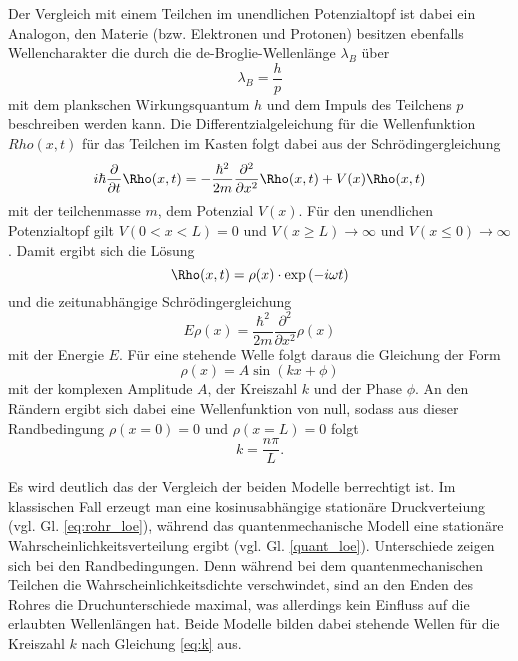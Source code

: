 Der Vergleich mit einem Teilchen im unendlichen Potenzialtopf ist dabei ein Analogon, 
den Materie (bzw. Elektronen und Protonen) besitzen ebenfalls Wellencharakter die durch die de-Broglie-Wellenlänge $\lambda_B$ über
\begin{equation}
    \lambda_B=\frac{h}{p}
\end{equation}
mit dem plankschen Wirkungsquantum $h$ und dem Impuls des Teilchens $p$ beschreiben werden kann.
Die Differentzialgeleichung für die Wellenfunktion $Rho(x,t)$ für das Teilchen im Kasten folgt dabei aus der Schrödingergleichung
\begin{equation}
    i\hbar \frac{\partial}{\partial t}\Rho(x,t)=-\frac{\hbar^2}{2m}\frac{\partial^2}{\partial x^2}\Rho(x,t)+V(x)\Rho(x,t)
\end{equation}
mit der teilchenmasse $m$, dem Potenzial $V(x)$. Für den unendlichen Potenzialtopf gilt $V(0 < x < L)=0$ und
$V(x \geq L)\rightarrow \infty$ und $V(x \leq 0)\rightarrow \infty$.
Damit ergibt sich die Lösung
\begin{equation}
    \Rho(x,t)=\rho(x)\cdot \exp{(-i\omega t)}
\end{equation}
und die zeitunabhängige Schrödingergleichung
\begin{equation}
    E\rho(x)=\frac{\hbar^2}{2m}\frac{\partial^2}{\partial x^2}\rho(x)
\end{equation}
mit der Energie $E$.
Für eine stehende Welle folgt daraus die Gleichung der Form
\begin{equation}
    \rho(x)=A\sin{(kx+\phi)}
    \label{eq:quant_loe}
\end{equation}
mit der komplexen Amplitude $A$, der Kreiszahl $k$ und der Phase $\phi$.
An den Rändern ergibt sich dabei eine Wellenfunktion von null, sodass aus dieser Randbedingung
$\rho(x=0)=0$ und $\rho(x=L)=0$ folgt
\begin{equation}
    k=\frac{n\pi}{L}.
    \label{eq:k}
\end{equation} 

Es wird deutlich das der Vergleich der beiden Modelle berrechtigt ist. Im klassischen Fall erzeugt man eine kosinusabhängige stationäre
Druckverteiung (vgl. Gl. \ref{eq:rohr_loe}), während das quantenmechanische Modell 
eine stationäre Wahrscheinlichkeitsverteilung ergibt (vgl. Gl. \ref{quant_loe}). Unterschiede zeigen sich bei den Randbedingungen.
Denn während bei dem quantenmechanischen Teilchen die Wahrscheinlichkeitsdichte verschwindet, sind an den Enden des Rohres 
die Druchunterschiede maximal, was allerdings kein Einfluss auf die erlaubten Wellenlängen hat.
Beide Modelle bilden dabei stehende Wellen für die Kreiszahl $k$ nach Gleichung \ref{eq:k} aus.

